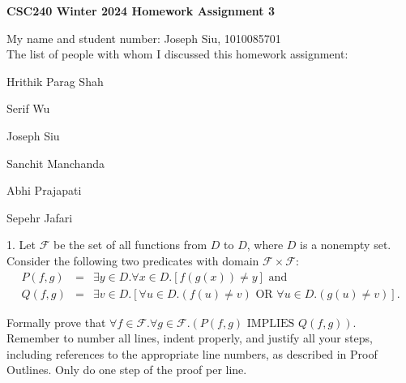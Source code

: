 \documentclass[11pt]{article}
\newcommand{\oor}{\,\,\mathrm{OR}\,\,}
\newcommand{\iimplies}{\,\,\mathrm{IMPLIES}\,\,}
\newcounter{ind}
\begin{document}
\begin{center}
{\bf \Large \bf CSC240 Winter 2024 Homework Assignment 3}\\
\end{center}

My name and student number: Joseph Siu, 1010085701\\
The list of people with whom I discussed this homework assignment:

Hrithik Parag Shah

Serif Wu

Joseph Siu 

Sanchit Manchanda

Abhi Prajapati

Sepehr Jafari

1.
Let ${\mathcal F}$ be the set of all functions from $D$ to $D$, where $D$ is a nonempty set.\\
Consider the following two predicates
with domain ${\mathcal F} \times {\mathcal F}$:
\begin{eqnarray*}
    P(f,g) &= &\exists y \in D. \forall x \in D.[ f(g(x)) \neq y] \mbox{  and }\\
    Q(f,g) &= &\exists v \in D.[  \forall u \in D. (f(u) \neq v) \oor \forall u \in D. (g(u) \neq v)].
\end{eqnarray*}

Formally prove that $\forall f \in {\mathcal F}. \forall g \in {\mathcal F}.(P(f,g) \iimplies Q(f,g))$.\\
Remember to number all lines, indent properly, and justify all your steps, including references to the appropriate line numbers, as described in Proof Outlines. Only do one step of the proof per line.
\end{document}
